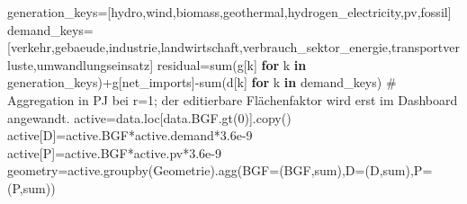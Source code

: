 \documentclass[
  ngerman,
  a4paper,
  DIV=11]{scrreprt}
\newenvironment{Shaded}{\begin{snugshade}}{\end{snugshade}}
\newcommand{\BuiltInTok}[1]{\textcolor[rgb]{0.00,0.23,0.31}{#1}}
\newcommand{\CommentTok}[1]{\textcolor[rgb]{0.37,0.37,0.37}{#1}}
\newcommand{\ControlFlowTok}[1]{\textcolor[rgb]{0.00,0.23,0.31}{\textbf{#1}}}
\newcommand{\DecValTok}[1]{\textcolor[rgb]{0.68,0.00,0.00}{#1}}
\newcommand{\FloatTok}[1]{\textcolor[rgb]{0.68,0.00,0.00}{#1}}
\newcommand{\KeywordTok}[1]{\textcolor[rgb]{0.00,0.23,0.31}{\textbf{#1}}}
\newcommand{\NormalTok}[1]{\textcolor[rgb]{0.00,0.23,0.31}{#1}}
\newcommand{\OperatorTok}[1]{\textcolor[rgb]{0.37,0.37,0.37}{#1}}
\newcommand{\StringTok}[1]{\textcolor[rgb]{0.13,0.47,0.30}{#1}}
\begin{document}
\begin{Shaded}
\begin{Highlighting}[]
\NormalTok{generation\_keys}\OperatorTok{=}\NormalTok{[}\StringTok{\textquotesingle{}hydro\textquotesingle{}}\NormalTok{,}\StringTok{\textquotesingle{}wind\textquotesingle{}}\NormalTok{,}\StringTok{\textquotesingle{}biomass\textquotesingle{}}\NormalTok{,}\StringTok{\textquotesingle{}geothermal\textquotesingle{}}\NormalTok{,}\StringTok{\textquotesingle{}hydrogen\_electricity\textquotesingle{}}\NormalTok{,}\StringTok{\textquotesingle{}pv\textquotesingle{}}\NormalTok{,}\StringTok{\textquotesingle{}fossil\textquotesingle{}}\NormalTok{]}
\NormalTok{demand\_keys}\OperatorTok{=}\NormalTok{[}\StringTok{\textquotesingle{}verkehr\textquotesingle{}}\NormalTok{,}\StringTok{\textquotesingle{}gebaeude\textquotesingle{}}\NormalTok{,}\StringTok{\textquotesingle{}industrie\textquotesingle{}}\NormalTok{,}\StringTok{\textquotesingle{}landwirtschaft\textquotesingle{}}\NormalTok{,}\StringTok{\textquotesingle{}verbrauch\_sektor\_energie\textquotesingle{}}\NormalTok{,}\StringTok{\textquotesingle{}transportverluste\textquotesingle{}}\NormalTok{,}\StringTok{\textquotesingle{}umwandlungseinsatz\textquotesingle{}}\NormalTok{]}
\NormalTok{residual}\OperatorTok{=}\BuiltInTok{sum}\NormalTok{(g[k] }\ControlFlowTok{for}\NormalTok{ k }\KeywordTok{in}\NormalTok{ generation\_keys)}\OperatorTok{+}\NormalTok{g[}\StringTok{\textquotesingle{}net\_imports\textquotesingle{}}\NormalTok{]}\OperatorTok{{-}}\BuiltInTok{sum}\NormalTok{(d[k] }\ControlFlowTok{for}\NormalTok{ k }\KeywordTok{in}\NormalTok{ demand\_keys)}
\CommentTok{\# Aggregation in PJ bei r=1; der editierbare Flächenfaktor wird erst im Dashboard angewandt.}
\NormalTok{active}\OperatorTok{=}\NormalTok{data.loc[data.BGF.gt(}\DecValTok{0}\NormalTok{)].copy()}
\NormalTok{active[}\StringTok{\textquotesingle{}D\textquotesingle{}}\NormalTok{]}\OperatorTok{=}\NormalTok{active.BGF}\OperatorTok{*}\NormalTok{active.demand}\OperatorTok{*}\FloatTok{3.6e{-}9}
\NormalTok{active[}\StringTok{\textquotesingle{}P\textquotesingle{}}\NormalTok{]}\OperatorTok{=}\NormalTok{active.BGF}\OperatorTok{*}\NormalTok{active.pv}\OperatorTok{*}\FloatTok{3.6e{-}9}
\NormalTok{geometry}\OperatorTok{=}\NormalTok{active.groupby(}\StringTok{\textquotesingle{}Geometrie\textquotesingle{}}\NormalTok{).agg(BGF}\OperatorTok{=}\NormalTok{(}\StringTok{\textquotesingle{}BGF\textquotesingle{}}\NormalTok{,}\StringTok{\textquotesingle{}sum\textquotesingle{}}\NormalTok{),D}\OperatorTok{=}\NormalTok{(}\StringTok{\textquotesingle{}D\textquotesingle{}}\NormalTok{,}\StringTok{\textquotesingle{}sum\textquotesingle{}}\NormalTok{),P}\OperatorTok{=}\NormalTok{(}\StringTok{\textquotesingle{}P\textquotesingle{}}\NormalTok{,}\StringTok{\textquotesingle{}sum\textquotesingle{}}\NormalTok{))}

\end{Highlighting}
\end{Shaded}
\end{document}
